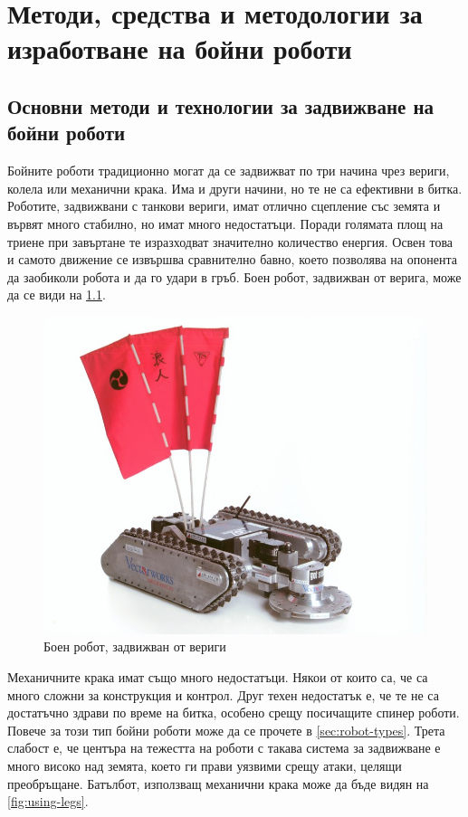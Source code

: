 \chapter{ Методи, средства и методологии за изработване на бойни роботи}


\section{Основни методи и технологии за задвижване на бойни роботи}
\label{sec:motion-types}

Бойните роботи традиционно могат да се задвижват по три начина чрез вериги, колела или механични крака. Има и други начини, но те не са ефективни в битка.
Роботите, задвижвани с танкови вериги, имат отлично сцепление със земята и вървят много стабилно, но имат много недостатъци. Поради голямата площ на триене при завъртане те изразходват значително количество енергия. Освен това и самото движение се извършва сравнително бавно, което позволява на опонента да заобиколи робота и да го удари в гръб. Боен робот, задвижван от верига, може да се види на \cref{fig:using-treads}.

\begin{figure}[H]
    \centering
    \includegraphics[width=0.5\linewidth]{images/using-treads.jpg}
    
    \caption{Боен робот, задвижван от вериги}
    \label{fig:using-treads} 
\end{figure}

Механичните крака имат също много недостатъци. Някои от които са, че са много сложни за конструкция и контрол. Друг техен недостатък е, че те не са достатъчно здрави по време на битка, особено срещу посичащите спинер роботи. Повече за този тип бойни роботи може да се прочете в \cref{sec:robot-types}. Трета слабост е, че центъра на тежестта на роботи с такава система за задвижване е много високо над земята, което ги прави уязвими срещу атаки, целящи преобръщане. Батълбот, използващ механични крака може да бъде видян на \cref{fig:using-legs}.

